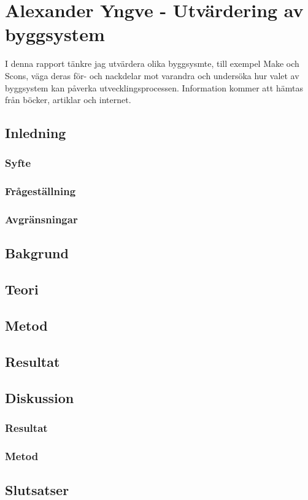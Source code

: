 \section{Alexander Yngve - Utvärdering av byggsystem}
I denna rapport tänkre jag utvärdera olika byggsysmte, till exempel
Make och Scons, väga deras för- och nackdelar mot varandra och
undersöka hur valet av byggsystem kan påverka utvecklingsprocessen.
\newline
Information kommer att hämtas från böcker, artiklar och internet.
	\subsection{Inledning}
	\subsubsection{Syfte}
	\subsubsection{Frågeställning}
	\subsubsection{Avgränsningar}
	\subsection{Bakgrund}
	\subsection{Teori}
	\subsection{Metod}
	\subsection{Resultat}
	\subsection{Diskussion}
	\subsubsection{Resultat}
	\subsubsection{Metod}
	\subsection{Slutsatser}
